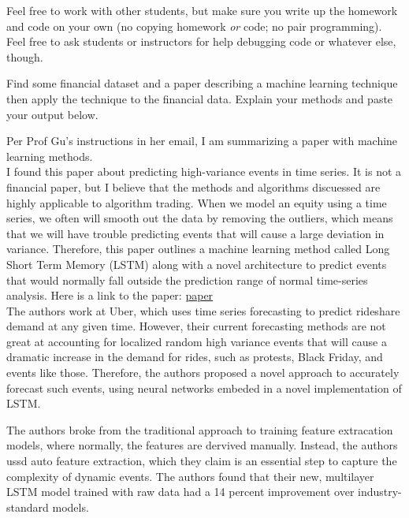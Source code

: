 \documentclass[12pt,letterpaper]{pset}
\begin{document}
Feel free to work with other students, but make sure you write up the homework
and code on your own (no copying homework \textit{or} code; no pair programming).
Feel free to ask students or instructors for help debugging code or whatever else,
though.\\

\begin{problem}[1]
  Find some financial dataset and a paper describing a machine learning
  technique then apply the technique to the financial data. Explain your
  methods and paste your output below.
\end{problem}

\begin{solution}

Per Prof Gu's instructions in her email, I am summarizing a paper with machine learning methods. \\

I found this paper about predicting high-variance events in time series. It is not a financial paper, but I believe that the methods and algorithms discuessed are highly applicable to algorithm trading. When we model an equity using a time series, we often will smooth out the data by removing the outliers, which means that we will have trouble predicting events that will cause a large deviation in variance. Therefore, this paper outlines a machine learning method called Long Short Term Memory (LSTM) along with a novel architecture to predict events that would normally fall outside the prediction range of normal time-series analysis. Here is a link to the paper: \href{http://roseyu.com/time-series-workshop/submissions/TSW2017_paper_3.pdf} {paper}\\

 The authors work at Uber, which uses time series forecasting to predict rideshare demand at any given time. However, their current forecasting methods are not great at accounting for localized random high variance events that will cause a dramatic increase in the demand for rides, such as protests, Black Friday, and events like those. Therefore, the authors proposed a novel approach to accurately forecast such events, using neural networks embeded in a novel implementation of LSTM.
 
 The authors broke from the traditional approach to training feature extracation models, where normally, the features are dervived manually. Instead, the authors ussd auto feature extraction, which they claim is an essential step to capture the complexity of dynamic events. The authors found that their new, multilayer LSTM model trained with raw data had a 14 percent improvement over industry-standard models.
 

\end{solution}
\end{document}
